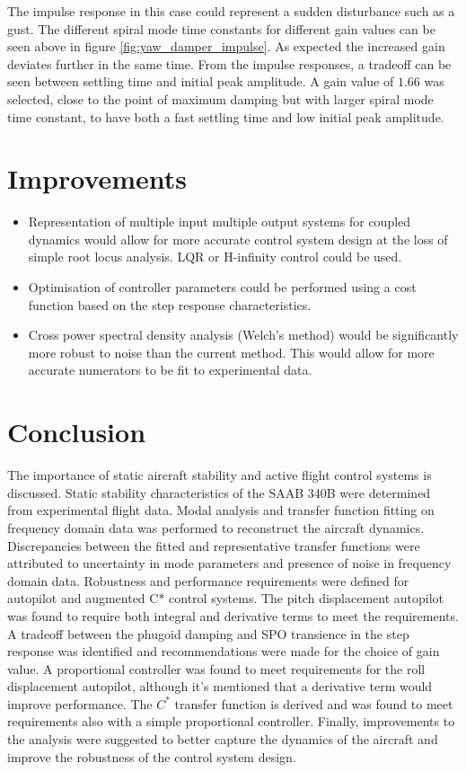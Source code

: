 \documentclass{article}
\begin{document}
The impulse response in this case could represent a sudden disturbance such as a gust.
The different spiral mode time constants for different gain values can be seen above in figure \ref{fig:yaw_damper_impulse}.
As expected the increased gain deviates further in the same time.
From the impulse responses, a tradeoff can be seen between settling time and initial peak amplitude.
A gain value of $1.66$ was selected, close to the point of maximum damping but with larger spiral mode time constant, to have both a fast settling time and low initial peak amplitude.

\section{Improvements}

\begin{itemize}
    \item Representation of multiple input multiple output systems for coupled dynamics would allow for more accurate control system design at the loss of simple root locus analysis. LQR or H-infinity control could be used.
    \item Optimisation of controller parameters could be performed using a cost function based on the step response characteristics.
    \item Cross power spectral density analysis (Welch's method) would be significantly more robust to noise than the current method.
    This would allow for more accurate numerators to be fit to experimental data.
\end{itemize}


\section{Conclusion}

The importance of static aircraft stability and active flight control systems is discussed.
Static stability characteristics of the SAAB 340B were determined from experimental flight data.
Modal analysis and transfer function fitting on frequency domain data was performed to reconstruct the aircraft dynamics.
Discrepancies between the fitted and representative transfer functions were attributed to uncertainty in mode parameters and presence of noise in frequency domain data.
Robustness and performance requirements were defined for autopilot and augmented C* control systems.
The pitch displacement autopilot was found to require both integral and derivative terms to meet the requirements.
A tradeoff between the phugoid damping and SPO transience in the step response was identified and recommendations were made for the choice of gain value.
A proportional controller was found to meet requirements for the roll displacement autopilot, although it's mentioned that a derivative term would improve performance.
The $C^*$ transfer function is derived and was found to meet requirements also with a simple proportional controller.
Finally, improvements to the analysis were suggested to better capture the dynamics of the aircraft and improve the robustness of the control system design.
\end{document}
